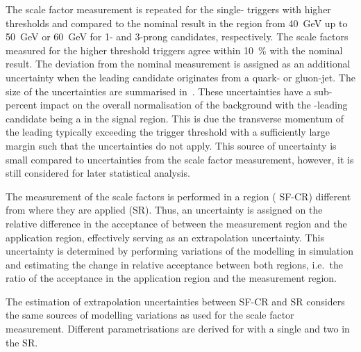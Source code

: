 The scale factor measurement is repeated for the single-\tauhadvis
triggers with higher thresholds and compared to the nominal result in
the \faketauhadvis \pT region from \SI{40}{\GeV} up to \SI{50}{\GeV}
or \SI{60}{\GeV} for 1- and 3-prong candidates, respectively. The
scale factors measured for the higher threshold triggers agree within
\SI{10}{\percent} with the nominal result. The deviation from the
nominal measurement is assigned as an additional uncertainty when the
leading \tauhadvis candidate originates from a quark- or
gluon-jet. The size of the uncertainties are summarised
in~. These uncertainties have a
sub-percent impact on the overall normalisation of the \ttbarFakes
background with the \pT-leading \tauhadvis candidate being a
\faketauhadvis in the \hadhad signal region. This is due the
transverse momentum of the leading \tauhadvis typically exceeding the
trigger threshold with a sufficiently large margin such that the
uncertainties do not apply. This source of uncertainty is small
compared to uncertainties from the scale factor measurement, however,
it is still considered for later statistical analysis.

\begin{table}[htbp]
  \centering

  \caption{Size of the uncertainty comparing scale factors measured
    for triggers with $\pTHLT > \SI{25}{\GeV}$ and
    $\pTHLT > \SI{35}{\GeV}$ thresholds. The uncertainty is given
    relative to all events from \ttbar in the \hadhad channel signal
    region where the leading \tauhadvis is a \faketauhadvis with \pT
    close to the \SI{40}{\GeV} threshold.}%
  \label{tab:ttbarSF_tau25_35_uncertainty}

  
\end{table}

The measurement of the scale factors is performed in a region (\lephad
SF-CR) different from where they are applied (\hadhad SR). Thus, an
uncertainty is assigned on the relative difference in the acceptance
of \ttbarFakes between the measurement region and the application
region, effectively serving as an extrapolation uncertainty. This
uncertainty is determined by performing variations of the \ttbar
modelling in simulation and estimating the change in relative
acceptance between both regions, i.e.\ the ratio of the acceptance in
the application region and the measurement region.

The estimation of extrapolation uncertainties between SF-CR and
\hadhad SR considers the same sources of \ttbar modelling variations
as used for the scale factor measurement. Different parametrisations
are derived for \ttbar with a single \faketauhadvis and two
\faketauhadvis in the \hadhad SR.


